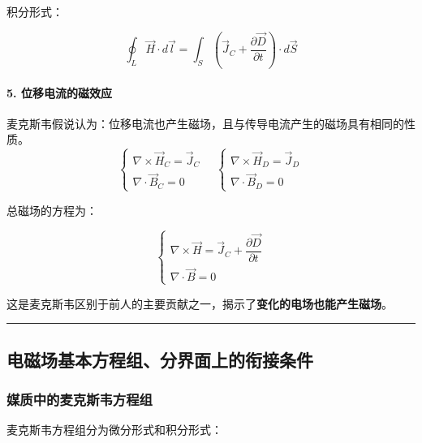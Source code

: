 积分形式：
\begin{formulaBox}
\[
\oint_{L} \vec{H} \cdot d\vec{l} = \int_{S} \left( \vec{J}_C + \frac{\partial \vec{D}}{\partial t} \right) \cdot d\vec{S}
\]
\end{formulaBox}

\paragraph{5. 位移电流的磁效应}
麦克斯韦假说认为：位移电流也产生磁场，且与传导电流产生的磁场具有相同的性质。
\[
\begin{cases}
\nabla \times \vec{H}_C = \vec{J}_C \\
\nabla \cdot \vec{B}_C = 0
\end{cases}
\quad
\begin{cases}
\nabla \times \vec{H}_D = \vec{J}_D \\
\nabla \cdot \vec{B}_D = 0
\end{cases}
\]

总磁场的方程为：
\begin{formulaBox}
\[
\begin{cases}
\nabla \times \vec{H} = \vec{J}_C + \dfrac{\partial \vec{D}}{\partial t} \\
\nabla \cdot \vec{B} = 0
\end{cases}
\]
\end{formulaBox}
这是麦克斯韦区别于前人的主要贡献之一，揭示了\textbf{变化的电场也能产生磁场}。

\vspace{0.8cm}\hrule\vspace{0.8cm}

\subsection{电磁场基本方程组、分界面上的衔接条件}
\subsubsection{媒质中的麦克斯韦方程组}
麦克斯韦方程组分为微分形式和积分形式：

